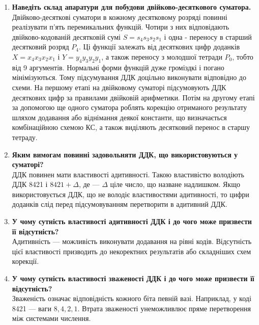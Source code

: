 \documentclass[12pt,a4paper]{article}
\begin{document}
\begin{enumerate}
    \item \textbf{Наведіть склад апаратури для побудови двійково-десяткового суматора.} \\
    Двійково-десяткові суматори в кожному десятковому розряді повинні реалізувати п'ять
    перемикальних функцій.
    Чотири з них відповідають двійково-кодованій десятковій сумі $S = s_4s_3s_2s_1$
    і одна - переносу в старший десятковий розряд $P_4$.
    Ці функції залежать від десяткових цифр доданків $X = x_4x_3x_2x_1$ і $Y = y_4y_3y_2y_1$,
    а також переносу з молодшої тетради $P_0$, тобто від 9 аргументів. Нормальні форми функцій дуже громіздкі і погано мінімізуються. Тому підсумування ДДК доцільно виконувати відповідно до схеми.
    На першому етапі на двійковому суматорі підсумовують ДДК десяткових цифр за правилами двійковій арифметики. Потім на другому етапі за допомогою ще одного суматора роблять корекцію отриманого результату шляхом додавання або віднімання деякої константи, що визначається комбінаційною схемою КС, а також виділяють десятковий перенос в старшу тетраду.

    \vspace{1em}

    \item \textbf{Яким вимогам повинні задовольняти ДДК, що використовуються у суматорі?} \\
    ДДК повинен мати властивості адитивності. Такою властивістю володіють ДДК 8421 і $8421+\Delta$, де --- $\Delta$ ціле число, що назване надлишком. Якщо використовується ДДК, що не володіє властивостями адитивності, то цифри доданків слід перед підсумовуванням перетворити в адитивний ДДК.

    \vspace{1em}

    \item \textbf{У чому сутність властивості адитивності ДДК і до чого може призвести її відсутність?} \\
    Адитивність — можливість виконувати додавання на рівні кодів. Відсутність цієї властивості призводить до некоректних результатів або складніших схем корекції.

    \vspace{1em}

    \item \textbf{У чому сутність властивості зваженості ДДК і до чого може призвести її відсутність?} \\
    Зваженість означає відповідність кожного біта певній вазі. Наприклад, у коді 8421 — ваги $8,4,2,1$. Втрата зваженості унеможливлює пряме перетворення між системами числення.


\end{enumerate}
\end{document}
